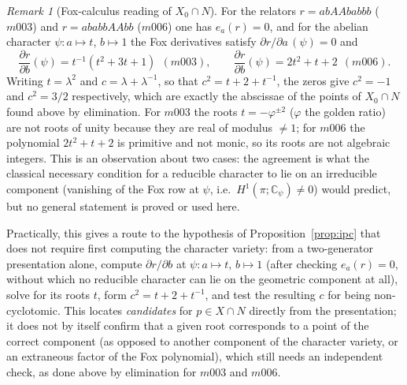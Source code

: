 \documentclass[11pt,a4paper]{article}
\theoremstyle{definition}
\theoremstyle{remark}
\newtheorem{remark}[theorem]{Remark}
\begin{document}
\begin{remark}[Fox-calculus reading of $X_0\cap N$]\label{rem:fox}
For the relators $r=abAAbabbb$ ($m003$) and $r=ababbAAbb$ ($m006$) one
has $e_a(r)=0$, and for the abelian character $\psi:a\mapsto t$, $b\mapsto1$
the Fox derivatives satisfy $\partial r/\partial a\,(\psi)=0$ and
\begin{equation}
\frac{\partial r}{\partial b}(\psi)=t^{-1}(t^2+3t+1)\ \ (m003),\qquad
\frac{\partial r}{\partial b}(\psi)=2t^2+t+2\ \ (m006).
\end{equation}
Writing $t=\lambda^2$ and $c=\lambda+\lambda^{-1}$, so that
$c^2=t+2+t^{-1}$, the zeros give $c^2=-1$ and $c^2=3/2$ respectively, which
are exactly the abscissae of the points of $X_0\cap N$ found above by
elimination. For $m003$ the roots $t=-\varphi^{\pm2}$ ($\varphi$ the golden
ratio) are not roots of unity because they are real of modulus
$\ne1$; for $m006$ the polynomial $2t^2+t+2$ is primitive and not monic, so its
roots are not algebraic integers. This is an observation about two cases: the
agreement is what the classical necessary condition for a reducible
character to lie on an irreducible component (vanishing of the Fox row at
$\psi$, i.e.\ $H^1(\pi;\mathbb{C}_\psi)\ne0$) would predict, but no
general statement is proved or used here.

Practically, this gives a route to the hypothesis of
Proposition~\ref{prop:ipc} that does not require first computing the
character variety: from a two-generator presentation alone, compute
$\partial r/\partial b$ at $\psi:a\mapsto t,\,b\mapsto1$ (after checking
$e_a(r)=0$, without which no reducible character can lie on the geometric
component at all), solve for its roots $t$, form $c^2=t+2+t^{-1}$, and
test the resulting $c$ for being non-cyclotomic. This locates
\emph{candidates} for $p\in X\cap N$ directly from the presentation; it
does not by itself confirm that a given root corresponds to a point of
the correct component (as opposed to another component of the character
variety, or an extraneous factor of the Fox polynomial), which still
needs an independent check, as done above by elimination for $m003$ and
$m006$.
\end{remark}
\end{document}

